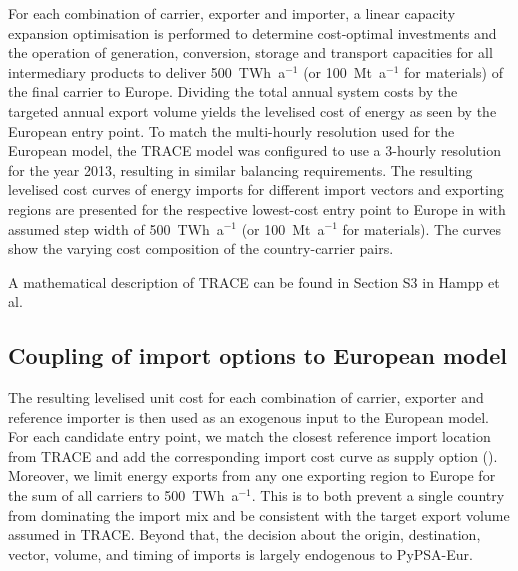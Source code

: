 For each combination of carrier, exporter and importer, a linear capacity
expansion optimisation is performed to determine cost-optimal investments and
the operation of generation, conversion, storage and transport capacities for
all intermediary products to deliver 500~TWh~a$^{-1}$ (or 100~Mt~a$^{-1}$ for
materials) of the final carrier to Europe. Dividing the total annual system
costs by the targeted annual export volume yields the levelised cost of energy
as seen by the European entry point. To match the multi-hourly resolution used
for the European model, the TRACE model was configured to use a 3-hourly
resolution for the year 2013, resulting in similar balancing requirements. The
resulting levelised cost curves of energy imports for different import vectors
and exporting regions are presented for the respective lowest-cost entry point
to Europe in
with assumed step width of 500~TWh~a$^{-1}$ (or 100~Mt~a$^{-1}$ for materials).
The curves show the varying cost composition of the country-carrier pairs.

A mathematical description of TRACE can be found in Section
S3 in Hampp et al.\cite{hamppImportOptions2023}


\subsection*{Coupling of import options to European model}

The resulting levelised unit cost for each combination of carrier, exporter and
reference importer is then used as an exogenous input to the European model. For
each candidate entry point, we match the closest reference import location from
TRACE and add the corresponding import cost curve as supply option
().
Moreover, we limit energy exports from any one exporting region to Europe for
the sum of all carriers to 500~TWh~a$^{-1}$. This is to both prevent a single
country from dominating the import mix and be consistent with the target export
volume assumed in TRACE. Beyond that, the decision about the origin,
destination, vector, volume, and timing of imports is largely endogenous to
PyPSA-Eur.


